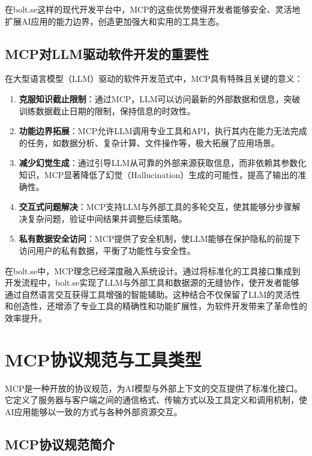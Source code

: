 在bolt.se这样的现代开发平台中，MCP的这些优势使得开发者能够安全、灵活地扩展AI应用的能力边界，创造更加强大和实用的工具生态。

\subsection{MCP对LLM驱动软件开发的重要性}
在大型语言模型（LLM）驱动的软件开发范式中，MCP具有特殊且关键的意义：

\begin{enumerate}
  \item \textbf{克服知识截止限制}：通过MCP，LLM可以访问最新的外部数据和信息，突破训练数据截止日期的限制，保持信息的时效性。
  
  \item \textbf{功能边界拓展}：MCP允许LLM调用专业工具和API，执行其内在能力无法完成的任务，如数据分析、复杂计算、文件操作等，极大拓展了应用场景。
  
  \item \textbf{减少幻觉生成}：通过引导LLM从可靠的外部来源获取信息，而非依赖其参数化知识，MCP显著降低了幻觉（Hallucination）生成的可能性，提高了输出的准确性。
  
  \item \textbf{交互式问题解决}：MCP支持LLM与外部工具的多轮交互，使其能够分步骤解决复杂问题，验证中间结果并调整后续策略。
  
  \item \textbf{私有数据安全访问}：MCP提供了安全机制，使LLM能够在保护隐私的前提下访问用户的私有数据，平衡了功能性与安全性。
\end{enumerate}

在bolt.se中，MCP理念已经深度融入系统设计。通过将标准化的工具接口集成到开发流程中，bolt.se实现了LLM与外部工具和数据源的无缝协作，使开发者能够通过自然语言交互获得工具增强的智能辅助。这种结合不仅保留了LLM的灵活性和创造性，还增添了专业工具的精确性和功能扩展性，为软件开发带来了革命性的效率提升。

\section{MCP协议规范与工具类型}

MCP是一种开放的协议规范，为AI模型与外部上下文的交互提供了标准化接口。它定义了服务器与客户端之间的通信格式、传输方式以及工具定义和调用机制，使AI应用能够以一致的方式与各种外部资源交互\cite{mcpspec2023}。

\subsection{MCP协议规范简介}


